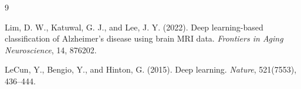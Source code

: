 \documentclass[12pt]{article}
\begin{document}
\begin{thebibliography}{9}

Lim, D. W., Katuwal, G. J., and Lee, J. Y. (2022).
Deep learning-based classification of Alzheimer’s disease using brain MRI data.
\textit{Frontiers in Aging Neuroscience}, 14, 876202.

LeCun, Y., Bengio, Y., and Hinton, G. (2015).
Deep learning.
\textit{Nature}, 521(7553), 436–444.

\end{thebibliography}
\end{document}

